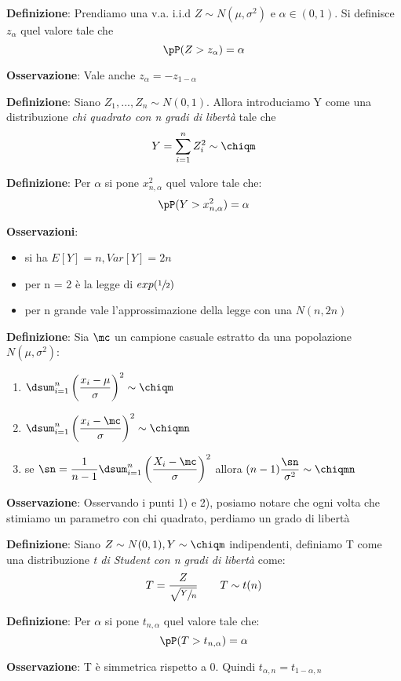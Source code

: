 \ind \textbf{Definizione}: Prendiamo una v.a. i.i.d $Z \sim N(\mu, \sigma^2)$ e $\alpha \in (0,1)$. Si definisce $z_{\alpha} $ quel valore tale che $$\pP(Z > z_{\alpha}) =\alpha$$ 

\ind \textbf{Osservazione}: Vale anche $z_{\alpha} = - z_{1 - \alpha}$ \n

\ind \textbf{Definizione}: Siano $Z_1, ..., Z_n \sim N(0,1)$. Allora introduciamo  Y come una distribuzione \textit{chi quadrato con n gradi di libertà} tale che  $$Y=\sum_{i=1}^n Z_i^2 \sim \chiqm$$

\ind \textbf{Definizione}: Per $\alpha$ si pone $x^2_{n, \alpha}$ quel valore tale che: $$\pP (Y > x^2_{n, \alpha}) = \alpha$$

\ind \textbf{Osservazioni}:
\begin{itemize}
    \item si ha $E[Y]=n, Var[Y]= 2n$ 
    \item per n = 2 è la legge di $exp(\sfrac{1}{2})$
    \item per n grande vale l'approssimazione della legge con una $N(n, 2n)$
\end{itemize}

\ind \textbf{Definizione}: Sia $\mc$ un campione casuale estratto da una popolazione $N(\mu, \sigma^2)$:
\begin{enumerate}
    \item $\dsum_{i=1}^n \left( \dfrac{x_i - \mu}{\sigma} \right)^2 \sim \chiqm$
    \item $\dsum_{i=1}^n \left( \dfrac{x_i - \mc}{\sigma} \right)^2 \sim \chiqmn$
    \item se $\sn = \dfrac{1}{n-1} \dsum_{i=1}^n \left( \dfrac{X_i - \mc}{\sigma} \right) ^2$ allora $(n -1) \dfrac{\sn}{\sigma^2} \sim \chiqmn$
\end{enumerate}

\ind \textbf{Osservazione}: Osservando i punti 1) e 2), posiamo notare che ogni volta che stimiamo un parametro con chi quadrato, perdiamo un grado di libertà \n

\ind \textbf{Definizione}: Siano $Z \sim N (0, 1), Y \sim \chiqm$ indipendenti, definiamo T come una distribuzione \textit{ t di Student con n gradi di libertà} come: $$T= \dfrac{Z}{\sqrt{\sfrac{ Y}{n}}} \qquad T \sim t(n)$$

\ind \textbf{Definizione}: Per $\alpha$ si pone $t_{n, \alpha}$ quel valore tale che: $$\pP (T > t_{n, \alpha}) = \alpha$$

\ind \textbf{Osservazione}: T è simmetrica rispetto a 0. Quindi $t_{\alpha, n} = t_{1 - \alpha, n}$


